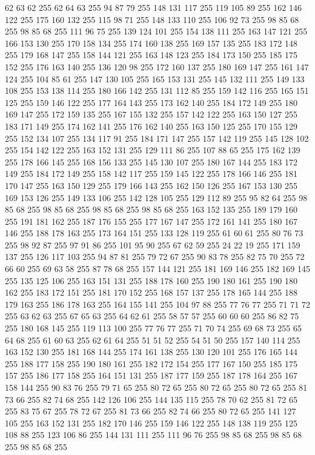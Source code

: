 62 63 62 255 62 64 63 255 94 87 79 255 148 131 117 255 119 105 89 255 162 146 122 255 175 160 132 255 115 98 71 255 148 133 110 255 106 92 73 255 98 85 68 255 98 85 68 255 111 96 75 255 139 124 101 255 154 138 111 255 163 147 121 255 166 153 130 255 170 158 134 255 174 160 138 255 169 157 135 255 183 172 148 255 179 168 147 255 158 144 121 255 163 148 123 255 184 173 150 255 185 175 152 255 176 163 140 255 136 120 98 255 172 160 137 255 180 169 147 255 161 147 124 255 104 85 61 255 147 130 105 255 165 153 131 255 145 132 111 255 149 133 108 255 153 138 114 255 180 166 142 255 131 112 85 255 159 142 116 255 165 151 125 255 159 146 122 255 177 164 143 255 173 162 140 255 184 172 149 255 180 169 147 255 172 159 135 255 167 155 132 255 157 142 122 255 163 150 127 255 183 171 149 255 174 162 141 255 176 162 140 255 163 150 125 255 170 155 129 255 152 134 107 255 134 117 91 255 184 171 147 255 157 142 119 255 145 128 102 255 154 142 122 255 163 152 131 255 129 111 86 255 107 88 65 255
175 162 139 255 178 166 145 255 168 156 133 255 145 130 107 255 180 167 144 255 183 172 149 255 184 172 149 255 158 142 117 255 159 145 122 255 178 166 146 255 181 170 147 255 163 150 129 255 179 166 143 255 162 150 126 255 167 153 130 255 169 153 126 255 149 133 106 255 142 128 105 255 129 112 89 255 95 82 64 255 98 85 68 255 98 85 68 255 98 85 68 255 98 85 68 255 163 152 135 255 189 179 160 255 191 181 162 255 187 176 155 255 177 167 147 255 172 161 141 255 180 167 146 255 188 178 163 255 173 164 151 255 133 128 119 255 61 60 61 255 80 76 73 255 98 92 87 255 97 91 86 255 101 95 90 255 67 62 59 255 24 22 19 255 171 159 137 255 126 117 103 255 94 87 81 255 79 72 67 255 90 83 78 255 82 75 70 255 72 66 60 255 69 63 58 255 87 78 68 255 157 144 121 255 181 169 146 255 182 169 145 255 135 125 106 255 163 151 131 255 188 178 160 255 190 180 161 255 190 180 162 255 183 172 151 255 181 170 152 255 168 157 137 255 178 165 144 255 188 179 163 255 186 178 163 255
164 155 141 255 104 97 88 255 77 76 77 255 71 71 72 255 63 62 63 255 67 65 63 255 64 62 61 255 58 57 57 255 60 60 60 255 86 82 75 255 180 168 145 255 119 113 100 255 77 76 77 255 71 70 74 255 69 68 73 255 65 64 68 255 61 60 63 255 62 61 64 255 51 51 52 255 54 51 50 255 157 140 114 255 163 152 130 255 181 168 144 255 174 161 138 255 130 120 101 255 176 165 144 255 188 177 158 255 190 180 161 255 182 172 154 255 177 167 150 255 185 175 157 255 186 177 158 255 164 151 131 255 187 177 159 255 187 178 164 255 167 158 144 255 90 83 76 255 79 71 65 255 80 72 65 255 80 72 65 255 80 72 65 255 81 73 66 255 82 74 68 255 142 126 106 255 144 135 115 255 78 70 62 255 81 72 65 255 83 75 67 255 78 72 67 255 81 73 66 255 82 74 66 255 80 72 65 255 141 127 105 255 163 152 131 255 182 170 146 255 159 146 122 255 148 138 119 255 125 108 88 255 123 106 86 255 144 131 111 255 111 96 76 255 98 85 68 255 98 85 68 255 98 85 68 255
